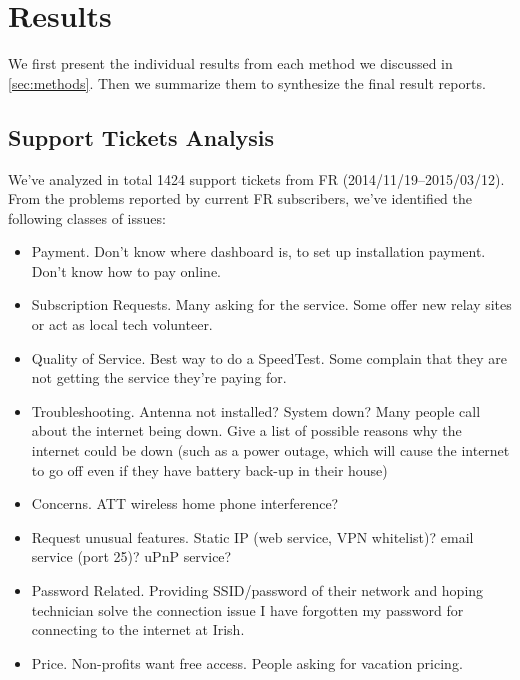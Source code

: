 \section{Results}
\label{sec:results}

We first present the individual results from each method we discussed in
\autoref{sec:methods}. Then we summarize them to synthesize the final result
reports.

\subsection{Support Tickets Analysis}
\label{sec:supp-tick-analys}

We've analyzed in total 1424 support tickets from FR
(2014/11/19--2015/03/12). From the problems reported by current FR subscribers,
we've identified the following classes of issues:


\begin{itemize}
\item Payment. Don’t know where dashboard is, to set up installation
  payment. Don't know how to pay online.
\item Subscription Requests. Many asking for the service. Some offer new relay
  sites or act as local tech volunteer. %
\item Quality of Service. Best way to do a SpeedTest. Some complain that they
  are not getting the service they're paying for.
\item Troubleshooting. Antenna not installed? System down? Many people call
  about the internet being down. Give a list of possible reasons why the
  internet could be down (such as a power outage, which will cause the internet
  to go off even if they have battery back-up in their house)
\item Concerns. ATT wireless home phone interference?
\item Request unusual features. Static IP (web service, VPN whitelist)? email
  service (port 25)? uPnP service?

\item Password Related. Providing SSID/password of their network and hoping
  technician solve the connection issue I have forgotten my password for
  connecting to the internet at Irish.
\item Price. Non-profits want free access. People asking for vacation pricing.
\end{itemize}

